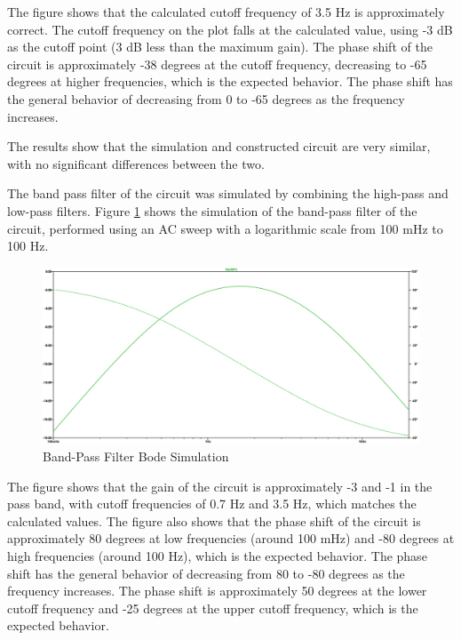 \documentclass[CMPE]{KGCOEReport}
\begin{document}
The figure shows that the calculated cutoff frequency of 3.5 Hz is approximately correct. The cutoff frequency on the plot falls at the calculated value, using -3 dB as the cutoff point (3 dB less than the maximum gain). The phase shift of the circuit is approximately -38 degrees at the cutoff frequency, decreasing to -65 degrees at higher frequencies, which is the expected behavior. The phase shift has the general behavior of decreasing from 0 to -65 degrees as the frequency increases.

The results show that the simulation and constructed circuit are very similar, with no significant differences between the two.

\bigskip

The band pass filter of the circuit was simulated by combining the high-pass and low-pass filters. Figure \ref{fig:bandPassSim} shows the simulation of the band-pass filter of the circuit, performed using an AC sweep with a logarithmic scale from 100 mHz to 100 Hz.

\begin{figure}[H]
    \centering
    \includegraphics[width=1\textwidth]{SimFreqBandPass.png}
    \caption{Band-Pass Filter Bode Simulation}
    \label{fig:bandPassSim}
\end{figure}

The figure shows that the gain of the circuit is approximately -3 and -1 in the pass band, with cutoff frequencies of 0.7 Hz and 3.5 Hz, which matches the calculated values. The figure also shows that the phase shift of the circuit is approximately 80 degrees at low frequencies (around 100 mHz) and -80 degrees at high frequencies (around 100 Hz), which is the expected behavior. The phase shift has the general behavior of decreasing from 80 to -80 degrees as the frequency increases. The phase shift is approximately 50 degrees at the lower cutoff frequency and -25 degrees at the upper cutoff frequency, which is the expected behavior.
\end{document}
